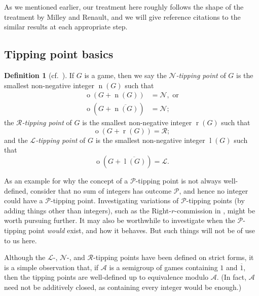 \documentclass[11pt]{article}
\theoremstyle{definition}
\newtheorem{definition}[theorem]{Definition}
\DeclareMathOperator{\outcome}{o}
\newcommand{\set}[1]{\mathcal{#1}}
\DeclareMathOperator{\ltp}{l}
\DeclareMathOperator{\ntp}{n}
\DeclareMathOperator{\rtp}{r}
\begin{document}
As we mentioned earlier, our treatment here roughly follows the shape of the
treatment by Milley and Renault, and we will give reference citations to the
similar results at each appropriate step.

\subsection{Tipping point basics}
\label{sec:tp-basics}

\begin{definition}[cf.\ {\cite[Definition 5 on
    p.~6]{milley.renault:invertible}}]
    \label{def:tipping-points}
    If $G$ is a game, then we say the \emph{$\mathscr{N}$-tipping point} of $G$
    is the smallest non-negative integer $\ntp(G)$ such that
    \begin{align*}
        \outcome(G+\ntp(G))&=\mathscr{N},\text{ or}\\
        \outcome(G+\overline{\ntp(G)})&=\mathscr{N};
    \end{align*}
    the \emph{$\mathscr{R}$-tipping point} of $G$ is the smallest non-negative
    integer $\rtp(G)$ such that
    \[
        \outcome(G+\rtp(G))=\mathscr{R};
    \]
    and the \emph{$\mathscr{L}$-tipping point} of $G$ is the smallest
    non-negative integer $\ltp(G)$ such that
    \[
        \outcome(G+\overline{\ltp(G)})=\mathscr{L}.
    \]
\end{definition}

As an example for why the concept of a $\mathscr{P}$-tipping point is not
always well-defined, consider that no sum of integers has outcome
$\mathscr{P}$, and hence no integer could have a $\mathscr{P}$-tipping point.
Investigating variations of $\mathscr{P}$-tipping points (by adding things
other than integers), such as the Right-$r$-commission in
\cite{davies.mckay.ea:pocancellation}, might be worth pursuing further. It may
also be worthwhile to investigate when the $\mathscr{P}$-tipping point
\emph{would} exist, and how it behaves. But such things will not be of use to
us here.

Although the $\mathscr{L}$-, $\mathscr{N}$-, and $\mathscr{R}$-tipping points
have been defined on strict forms, it is a simple observation that, if
$\set{A}$ is a semigroup of games containing $1$ and $\overline{1}$, then the
tipping points are well-defined up to equivalence modulo $\set{A}$. (In fact,
$\set{A}$ need not be additively closed, as containing every integer would be
enough.)
\end{document}
